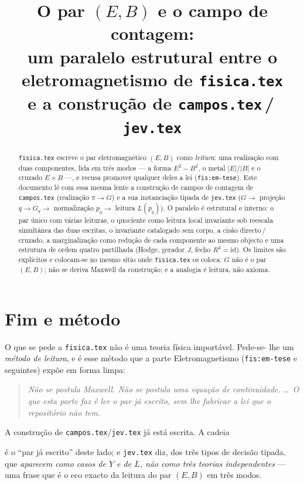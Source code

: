 \documentclass[11pt,a4paper]{article}
\title{O par $(E,B)$ e o campo de contagem:\\
um paralelo estrutural entre o eletromagnetismo de \texttt{fisica.tex}\\
e a construção de \texttt{campos.tex}\,/\,\texttt{jev.tex}}
\author{}
\date{}
\newcommand{\abs}[1]{\lvert #1\rvert}
\begin{document}
\maketitle

\begin{abstract}
\noindent
\texttt{fisica.tex} escreve o par eletromagnético $(E,B)$ como \emph{leitura}:
uma realização com duas componentes, lida em três modos --- a forma
$E^{2}-B^{2}$, o metal $\abs{E}/\abs{B}$ e o cruzado $E\times B$ ---, e recusa
promover qualquer deles a lei (\texttt{fis:em-tese}). Este documento lê com
essa mesma lente a construção de campos de contagem de \texttt{campos.tex}
(realização $\pi\to G$) e a sua instanciação tipada de \texttt{jev.tex}
($G\to$ projeção $q\to G_q\to$ normalização $p_q\to$ leitura $L(p_q)$).
O paralelo é estrutural e interno: o par único com várias leituras, o quociente
como leitura local invariante sob reescala simultânea das duas escritas, o
invariante catalogado sem corpo, a cisão directo\,/\,cruzado, a marginalização
como redução de cada componente ao mesmo objecto e uma estrutura de ordem
quatro partilhada (Hodge, gerador $J$, fecho $R^{4}=\mathrm{id}$).
Os limites são explícitos e colocam-se no mesmo sítio onde \texttt{fisica.tex}
os coloca: $G$ não é o par $(E,B)$; não se deriva Maxwell da construção; e a
analogia é leitura, não axioma.
\end{abstract}

\section{Fim e método}\label{sec:metodo}

O que se pede a \texttt{fisica.tex} não é uma teoria física importável. Pede-se-
lhe um \emph{método de leitura}, e é esse método que a parte Eletromagnetismo
(\texttt{fis:em-tese} e seguintes) expõe em forma limpa:

\begin{quote}
\emph{Não se postula Maxwell. Não se postula uma equação de continuidade.}
\ldots\ \emph{O que esta parte faz é ler o par já escrito, sem lhe fabricar a
lei que o repositório não tem.}
\end{quote}

\begin{center}
\end{center}

A construção de \texttt{campos.tex}/\texttt{jev.tex} já está escrita. A cadeia
\begin{center}
\end{center}
\noindent é o ``par já escrito'' deste lado; e \texttt{jev.tex} diz, dos três
tipos de decisão tipada, que \emph{aparecem como casos de $Y$ e de $L$, não
como três teorias independentes} --- uma frase que é o eco exacto da leitura do
par $(E,B)$ em três modos.
\end{document}
